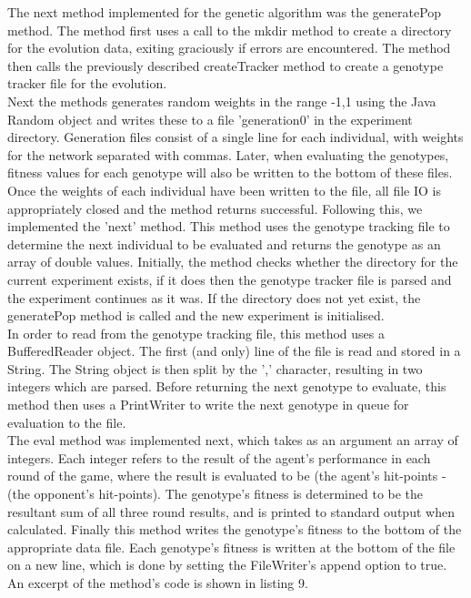 \documentclass[12pt,a4paper]{article}
\begin{document}
The next method implemented for the genetic algorithm was the generatePop method. The method first uses a call to the mkdir method to create a directory for the evolution data, exiting graciously if errors are encountered. The method then calls the previously described createTracker method to create a genotype tracker file for the evolution.\\

Next the methods generates random weights in the range -1,1 using the Java Random object and writes these to a file 'generation0' in the experiment directory. Generation files consist of a single line for each individual, with weights for the network separated with commas. Later, when evaluating the genotypes, fitness values for each genotype will also be written to the bottom of these files. Once the weights of each individual have been written to the file, all file IO is appropriately closed and the method returns successful.
\newpage
Following this, we implemented the 'next' method. This method uses the genotype tracking file to determine the next individual to be evaluated and returns the genotype as an array of double values. Initially, the method checks whether the directory for the current experiment exists, if it does then the genotype tracker file is parsed and the experiment continues as it was. If the directory does not yet exist, the generatePop method is called and the new experiment is initialised.\\

In order to read from the genotype tracking file, this method uses a BufferedReader object. The first (and only) line of the file is read and stored in a String. The String object is then split by the ',' character, resulting in two integers which are parsed. Before returning the next genotype to evaluate, this method then uses a PrintWriter to write the next genotype in queue for evaluation to the file.\\

The eval method was implemented next, which takes as an argument an array of integers. Each integer refers to the result of the agent's performance in each round of the game, where the result is evaluated to be (the agent's hit-points - (the opponent's hit-points). The genotype's fitness is determined to be the resultant sum of all three round results, and is printed to standard output when calculated. Finally this method writes the genotype's fitness to the bottom of the appropriate data file. Each genotype's fitness is written at the bottom of the file on a new line, which is done by setting the FileWriter's append option to true. An excerpt of the method's code is shown in listing 9.\\
\end{document}
